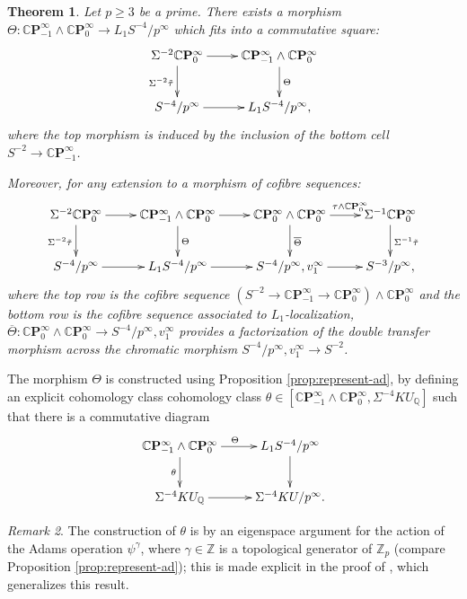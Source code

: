 \documentclass[10pt,a4paper]{amsart}
\newtheorem{thm}{Theorem}[section]
\theoremstyle{definition}
\theoremstyle{remark}
\newtheorem{rem}[thm]{Remark}
\newcommand{\zed}{\mathbb{Z}}
\newcommand{\rat}{\mathbb{Q}}
\newcommand{\padics}{\zed_p}
\newcommand{\cp}{\mathbb{C} \mathbf{P}^\infty}
\renewcommand{\smash}{\wedge}
\begin{document}
\begin{thm}
\cite{BCGHRW}
\label{thm:chromatic-factor}
Let $p \geq 3$ be a prime.
There exists a morphism $\Theta : \cp_{-1} \smash \cp_0 \rightarrow L_1 S^{-4}/p^\infty$ which fits into a commutative square:
\begin{eqnarray}
\label{eqn:Theta_extends_tautilde}
\xymatrix{
\Sigma^{-2} \cp_0
\ar[r]
\ar[d]_{\Sigma^{-2}\tilde{\tau}}
&
\cp_{-1} \smash \cp_0
\ar[d]^\Theta
\\
S^{-4} /p^\infty
\ar[r]
&
L_1 S ^{-4}/p^\infty,
}
\end{eqnarray}
where the top morphism is induced by the inclusion of the bottom cell $S^{-2} \rightarrow \cp_{-1}$.

Moreover, for any extension to a  morphism of cofibre sequences:
\[
\xymatrix{
\Sigma^{-2} \cp_0
\ar[r]
\ar[d]_{\Sigma^{-2}\tilde{\tau}}
&
\cp_{-1} \smash \cp_0
\ar[d]^\Theta
\ar[r]
&
\cp_0 \smash \cp_0
\ar[d]^{\overline{\Theta}}
\ar[r]^(.6){\tau \smash \cp_0}
&
\Sigma ^{-1}\cp_0
\ar[d]^{\Sigma^{-1} \tilde{\tau}}
\\
S^{-4} /p^\infty
\ar[r]
&
L_1 S ^{-4}/p^\infty
\ar[r]
&
S^{-4} /p^\infty , v_1^\infty
\ar[r]
&
 S^{-3}/p^\infty,
}
\]
where the top row is the cofibre sequence $(S^{-2}\rightarrow
\cp_{-1} \rightarrow \cp_0)\smash \cp_0 $ and the bottom row is the cofibre
sequence associated to $L_1$-localization,  $\overline{\Theta} :
\cp_0 \smash \cp_0
\rightarrow S^{-4} /p^\infty , v_1^\infty$ provides a factorization of
the double transfer morphism across the chromatic morphism $S^{-4}
/p^\infty , v_1^\infty \rightarrow S^{-2}$.
\end{thm}



The morphism $\Theta$ is constructed using Proposition \ref{prop:represent-ad}, by defining an
explicit cohomology class cohomology class $\theta \in [\cp_{-1} \smash \cp_0 , \Sigma^{-4} KU _\rat ]$ such that there
is a commutative diagram
\begin{eqnarray}
\label{eqn:theta_Q_representative}
\xymatrix{
\cp_{-1}\smash \cp_0
\ar[r]^\Theta
\ar[d]_\theta
&
L_1 S ^{-4}/p^\infty
\ar[d]
\\
\Sigma^{-4} KU _\rat
\ar[r]
&
\Sigma^{-4} KU /p^\infty.
}
\end{eqnarray}


\begin{rem}
	The construction of $\theta$ is by an eigenspace argument for the action of the Adams operation $\psi^\gamma$,
where $\gamma \in \zed$ is a topological generator of $\padics$ (compare  Proposition \ref{prop:represent-ad}); this is made explicit in the proof of \cite[Proposition 2.4]{imaoka}, which generalizes this result.
\end{rem}
\end{document}
